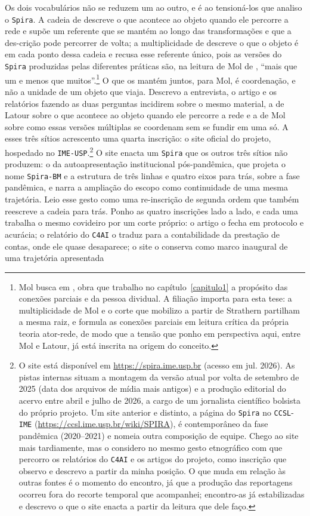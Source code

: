 Os dois vocabulários não se reduzem um ao outro, e é ao tensioná-los que analiso o \texttt{Spira}. A cadeia de \textcite{Latour2017Esperanca} descreve o que acontece ao objeto quando ele percorre a rede e supõe um referente que se mantém ao longo das transformações e que a des-crição pode percorrer de volta; a multiplicidade de \textcite{mol2002body} descreve o que o objeto é em cada ponto dessa cadeia e recusa esse referente único, pois as versões do \texttt{Spira} produzidas pelas diferentes práticas são, na leitura de Mol de \textcite[p.~35]{strathern2005partial}, \enquote{mais que um e menos que muitos}.\footnote{Mol busca em \textcite[p.~35]{strathern2005partial}, obra que trabalho no capítulo~\ref{capitulo1} a propósito das conexões parciais e da pessoa dividual. A filiação importa para esta tese: a multiplicidade de Mol e o corte que mobilizo a partir de Strathern partilham a mesma raiz, e \textcite{strathern2005partial} formula as conexões parciais em leitura crítica da própria teoria ator-rede, de modo que a tensão que ponho em perspectiva aqui, entre Mol e Latour, já está inscrita na origem do conceito.} O que os mantém juntos, para Mol, é coordenação, e não a unidade de um objeto que viaja. Descrevo a entrevista, o artigo e os relatórios fazendo as duas perguntas incidirem sobre o mesmo material, a de Latour sobre o que acontece ao objeto quando ele percorre a rede e a de Mol sobre como essas versões múltiplas se coordenam sem se fundir em uma só. A esses três sítios acrescento uma quarta inscrição: o site oficial do projeto, hospedado no \texttt{IME-USP}.\footnote{O site está disponível em \url{https://spira.ime.usp.br} (acesso em jul. 2026). As pistas internas situam a montagem da versão atual por volta de setembro de 2025 (data dos arquivos de mídia mais antigos) e a produção editorial do acervo entre abril e julho de 2026, a cargo de um jornalista científico bolsista do próprio projeto. Um site anterior e distinto, a página do \texttt{Spira} no \texttt{CCSL}-\texttt{IME} (\url{https://ccsl.ime.usp.br/wiki/SPIRA}), é contemporâneo da fase pandêmica (2020--2021) e nomeia outra composição de equipe. Chego ao site mais tardiamente, mas o considero no mesmo gesto etnográfico com que percorro os relatórios do \texttt{C4AI} e os artigos do projeto, como inscrição que observo e descrevo a partir da minha posição. O que muda em relação às outras fontes é o momento do encontro, já que a produção das reportagens ocorreu fora do recorte temporal que acompanhei; encontro-as já estabilizadas e descrevo o que o site enacta a partir da leitura que dele faço.} O site enacta um \texttt{Spira} que os outros três sítios não produzem: o da autoapresentação institucional pós-pandêmica, que projeta o nome \texttt{Spira-BM} e a estrutura de três linhas e quatro eixos para trás, sobre a fase pandêmica, e narra a ampliação do escopo como continuidade de uma mesma trajetória. Leio esse gesto como uma re-inscrição de segunda ordem que também reescreve a cadeia para trás. Ponho as quatro inscrições lado a lado, e cada uma trabalha o mesmo covideiro por um corte próprio: o artigo o fecha em protocolo e acurácia; o relatório do \texttt{C4AI} o traduz para a contabilidade da prestação de contas, onde ele quase desaparece; o site o conserva como marco inaugural de uma trajetória apresentada 
